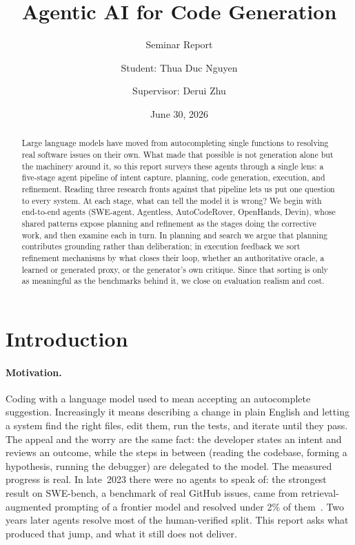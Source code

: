 \documentclass[
  english,        %
  font=times,     %
  twocolumn,      %
]{tumarticle}
\title{Agentic AI for Code Generation}
\subtitle{Seminar Report}
\author[affil=1, email=thuaduc.nguyen@tum.de]{Student: Thua Duc Nguyen}
\author[affil=1, email=derui.zhu@tum.de]{Supervisor: Derui Zhu}
\affil[mark=1]{\theDepartmentName, \theUniversityName}
\date{June 30, 2026}
\begin{document}
\maketitle

\begin{abstract}
  Large language models have moved from autocompleting single functions to
  resolving real software issues on their own. What made that possible is not
  generation alone but the machinery around it, so this report surveys these
  agents through a single lens: a five-stage agent pipeline of intent capture,
  planning, code generation, execution, and refinement. Reading three research
  fronts against that pipeline lets us put one question to every system. At each
  stage, what can tell the model it is wrong? We begin with end-to-end agents
  (SWE-agent, Agentless, AutoCodeRover, OpenHands, Devin), whose shared patterns
  expose planning and refinement as the stages doing the corrective work, and then
  examine each in turn. In planning and search we argue that planning contributes
  grounding rather than deliberation; in execution feedback we sort refinement
  mechanisms by what closes their loop, whether an authoritative oracle, a learned
  or generated proxy, or the generator's own critique. Since that sorting is only
  as meaningful as the benchmarks behind it, we close on evaluation realism and
  cost.
\end{abstract}

\section{Introduction}

\paragraph{Motivation.}
Coding with a language model used to mean accepting an autocomplete suggestion.
Increasingly it means describing a change in plain English and letting a system
find the right files, edit them, run the tests, and iterate until they pass. The
appeal and the worry are the same fact: the developer states an intent and reviews
an outcome, while the steps in between (reading the codebase, forming a
hypothesis, running the debugger) are delegated to the model. The measured
progress is real. In late~2023 there were no agents to speak of: the strongest
result on SWE-bench, a benchmark of real GitHub issues, came from
retrieval-augmented prompting of a frontier model and resolved under 2\% of
them~\cite{jimenez2024swebench}. Two years later agents resolve most of the
human-verified split. This report asks what produced that jump, and what it still
does not deliver.
\end{document}
